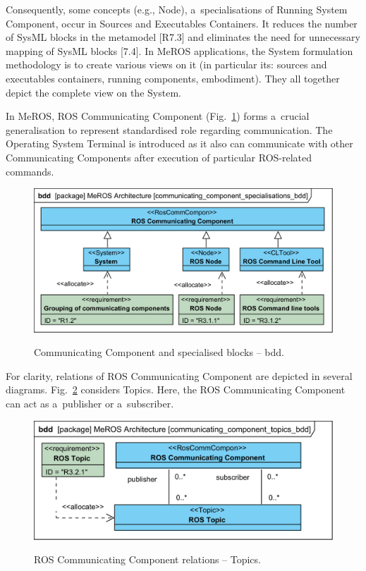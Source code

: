 \documentclass[11pt,oneside,a4paper]{report}
\begin{document}
	Consequently, some concepts (e.g., Node), a~specialisations of Running System Component, occur in Sources and Executables Containers. It reduces the number of SysML blocks in the metamodel [R7.3] and eliminates the need for unnecessary mapping of SysML blocks [7.4]. In MeROS applications, the System formulation methodology is to create various views on it (in particular its: sources and executables containers, running components, embodiment). They all together depict the complete view on the System.
	
	In MeROS, ROS Communicating Component (Fig.~\ref{fig:communicating_components_bdd}) forms a~crucial generalisation to represent standardised role regarding communication. The Operating System Terminal is introduced as it also can communicate with other Communicating Components after execution of particular ROS-related commands.
	
		
	\begin{figure}[H]
		\centering
		\begin{center}
			{\includegraphics[scale=1.0]{diagrams/communicating_component_specialisations_bdd.png}}
		\end{center}
		\caption{Communicating Component and specialised blocks -- bdd.} 
		\label{fig:communicating_components_bdd}
	\end{figure}
	
	For clarity, relations of ROS Communicating Component are depicted in several diagrams. Fig.~\ref{fig:communicating_component_topics_bdd} considers Topics. Here, the ROS Communicating Component can act as a~publisher or a~subscriber.	
	 
	
	\begin{figure}[H]
		\centering
		\begin{center}
			{\includegraphics[scale=1.0]{diagrams/communicating_component_topics_bdd.png}}
		\end{center}
		\caption{ROS Communicating Component relations -- Topics.} 
		\label{fig:communicating_component_topics_bdd}
	\end{figure}
	
\end{document}
